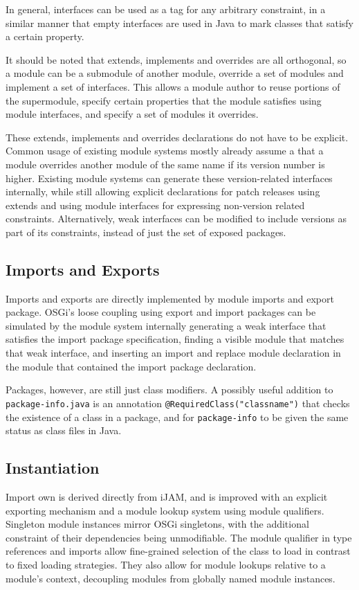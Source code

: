 In general, interfaces can be used as a tag for any arbitrary constraint, 
in a similar manner that empty interfaces are used in Java to mark classes 
that satisfy a certain property.

It should be noted that extends, implements and overrides are all orthogonal,
so a module can be a submodule of another module, override a set of modules and
implement a set of interfaces. This allows a module author to reuse portions
of the supermodule, specify certain properties that the module satisfies
using module interfaces, and specify a set of modules it overrides.

These extends, implements and overrides declarations do not have to be explicit.
Common usage of existing module systems mostly already assume a that a 
module overrides another module of the same name if its version 
number is higher. Existing module systems can generate these version-related interfaces 
internally, while still allowing explicit declarations for patch releases 
using extends and using module interfaces for expressing non-version
related constraints. Alternatively, weak interfaces can be modified to include
versions as part of its constraints, instead of just the set of exposed packages.

\subsection{Imports and Exports}

Imports and exports are directly implemented by module imports and export package.
OSGi's loose coupling using export and import packages can be simulated by
the module system internally generating a weak interface that satisfies the import
package specification, finding a visible module that matches that weak interface, and
inserting an import and replace module declaration in the module that contained the import package
declaration.

Packages, however, are still just class modifiers. A possibly useful addition to 
\texttt{package-info.java} is an annotation \texttt{@RequiredClass("classname")}
that checks the existence of a class in a package, and for \texttt{package-info}
to be given the same status as class files in Java.

\subsection{Instantiation}

Import own is derived directly from iJAM, and is improved with an explicit exporting 
mechanism and a module lookup system using module qualifiers. Singleton module instances mirror
OSGi singletons, with the additional constraint of their dependencies being unmodifiable. 
The module qualifier in type references and
imports allow fine-grained selection of the class to load in contrast
to fixed loading strategies. They also allow for module lookups relative to
a module's context, decoupling modules from globally named module instances.

